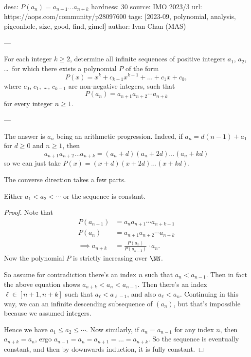 desc: $P(a_n) = a_{n+1} \dots a_{n+k}$
hardness: 30
source: IMO 2023/3
url: https://aops.com/community/p28097600
tags: [2023-09, polynomial, analysis, pigeonhole, size, good, find, gimel]
author: Ivan Chan (MAS)

---

For each integer $k\geq 2$, determine all infinite sequences of positive integers
$a_1$, $a_2$, \dots\ for which there exists a polynomial $P$ of the form
\[ P(x)=x^k+c_{k-1}x^{k-1}+\dots + c_1 x+c_0, \]
where $c_0$, $c_1$, \dots, $c_{k-1}$ are non-negative integers, such that
\[ P(a_n)=a_{n+1}a_{n+2}\dotsm a_{n+k} \]
for every integer $n\geq 1$.

---

The answer is $a_n$ being an arithmetic progression.
Indeed, if $a_n = d(n-1) + a_1$ for $d \ge 0$ and $n \ge 1$, then
\[ a_{n+1} a_{n+2} \dots a_{n+k} = (a_n+d)(a_n+2d)\dots(a_n+kd) \]
so we can just take $P(x) = (x+d)(x+2d) \dots (x+kd)$.

The converse direction takes a few parts.
\begin{claim*}
  Either $a_1 < a_2 < \dotsb$ or the sequence is constant.
\end{claim*}
\begin{proof}
  Note that
  \begin{align*}
    P(a_{n-1}) &= a_{n}a_{n+1}\dotsm a_{n+k-1} \\
    P(a_n) &= a_{n+1}a_{n+2}\dotsm a_{n+k} \\
    \implies a_{n+k} &= \frac{P(a_n)}{P(a_{n-1})} \cdot a_n.
  \end{align*}
  Now the polynomial $P$ is strictly increasing over $\NN$.

  So assume for contradiction there's an index $n$ such that $a_n < a_{n-1}$.
  Then in fact the above equation shows $a_{n+k} < a_n < a_{n-1}$.
  Then there's an index $\ell \in [n+1,n+k]$ such that
  $a_\ell < a_{\ell-1}$, and also $a_\ell < a_n$.
  Continuing in this way, we can an infinite descending subsequence of $(a_n)$,
  but that's impossible because we assumed integers.

  Hence we have $a_1 \le a_2 \le \dotsb$.
  Now similarly, if $a_n = a_{n-1}$ for any index $n$, then $a_{n+k} = a_n$,
  ergo $a_{n-1} = a_n = a_{n+1} = \dots = a_{n+k}$.
  So the sequence is eventually constant, and then by downwards induction,
  it is fully constant.
\end{proof}

